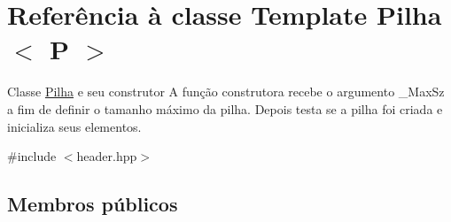 \hypertarget{class_pilha}{\section{Referência à classe Template Pilha$<$ P $>$}
\label{class_pilha}
}


Classe \hyperlink{class_pilha}{Pilha} e seu construtor A função construtora recebe o argumento \-\_\-\-Max\-Sz a fim de definir o tamanho máximo da pilha. Depois testa se a pilha foi criada e inicializa seus elementos.  




{\ttfamily \#include $<$header.\-hpp$>$}

\subsection*{Membros públicos}
